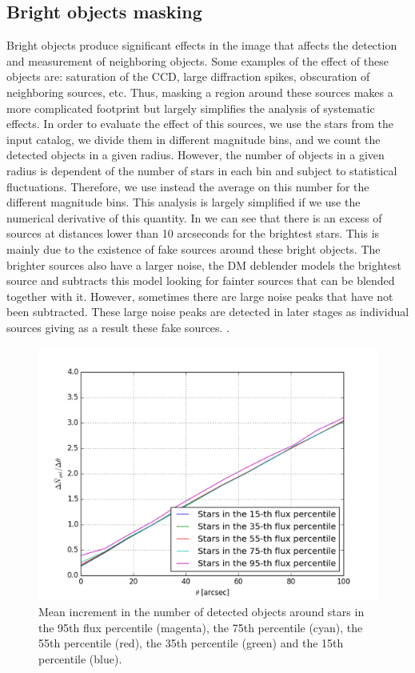 \documentclass[\docopts]{\docclass}
\begin{document}
\subsection{Bright objects masking}

Bright objects produce significant effects in the image that affects the detection and measurement of neighboring objects. Some examples of the effect of these objects are: saturation of the CCD, large diffraction spikes, obscuration of neighboring sources, etc. Thus, masking a region around these sources makes a more complicated footprint but largely simplifies the analysis of systematic effects. In order to evaluate the effect of this sources, we use the stars from the input catalog, we divide them in different magnitude bins, and we count the detected objects in a given radius.  However, the number of objects in a given radius is dependent of the number of stars in each bin and subject to statistical fluctuations. Therefore, we use instead the average on this number for the different magnitude bins. This analysis is largely simplified if we use the numerical derivative of this quantity. In  we can see that there is an excess of sources at distances lower than 10 arcseconds for the brightest stars. This is mainly due to the existence of fake sources around these bright objects. The brighter sources also have a larger noise, the DM deblender models the brightest source and subtracts this model looking for fainter sources that can be blended together with it. However, sometimes there are large noise peaks that have not been subtracted. These large noise peaks are detected in later stages as individual sources giving as a result these fake sources. .

\begin{figure}
\centering
\includegraphics[width=0.9\columnwidth]{dngal_dtheta.png}
\caption{Mean increment in the number of detected objects around stars in the 95th flux percentile (magenta), the 75th percentile (cyan), the 55th percentile (red), the 35th percentile (green) and the 15th percentile (blue).}
\label{fig:galdens_derivative}
\end{figure}
\end{document}
